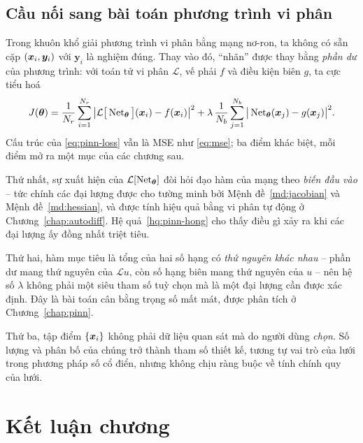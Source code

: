 \subsection{Cầu nối sang bài toán phương trình vi phân}
 
\begin{nhanxet}
\label{nx:cau-noi}
Trong khuôn khổ giải phương trình vi phân bằng mạng nơ-ron, ta không có sẵn cặp
$(\bm{x}_i,\bm{y}_i)$ với $\bm{y}_i$ là nghiệm đúng. Thay vào đó, ``nhãn'' được
thay bằng \emph{phần dư} của phương trình: với toán tử vi phân $\mathcal{L}$, vế
phải $f$ và điều kiện biên $g$, ta cực tiểu hoá
\begin{equation}
J(\bm{\theta})
 = \frac{1}{N_r}\sum_{i=1}^{N_r}
   \big| \mathcal{L}\big[\operatorname{Net}_{\bm{\theta}}\big](\bm{x}_i) - f(\bm{x}_i) \big|^{2}
 + \lambda\,\frac{1}{N_b}\sum_{j=1}^{N_b}
   \big| \operatorname{Net}_{\bm{\theta}}(\bm{x}_j) - g(\bm{x}_j) \big|^{2}.
\label{eq:pinn-loss}
\end{equation}
Cấu trúc của \eqref{eq:pinn-loss} vẫn là MSE như \eqref{eq:mse}; ba điểm khác
biệt, mỗi điểm mở ra một mục của các chương sau.
 
Thứ nhất, sự xuất hiện của $\mathcal{L}[\operatorname{Net}_{\bm{\theta}}]$ đòi hỏi đạo hàm của
mạng theo \emph{biến đầu vào} -- tức chính các đại lượng được cho tường minh bởi
Mệnh đề~\ref{md:jacobian} và Mệnh đề~\ref{md:hessian}, và được tính hiệu quả
bằng vi phân tự động ở Chương~\ref{chap:autodiff}.
Hệ quả~\ref{hq:pinn-hong} cho thấy điều gì xảy ra khi các đại lượng ấy đồng nhất
triệt tiêu.
 
Thứ hai, hàm mục tiêu là tổng của hai số hạng có \emph{thứ nguyên khác nhau} --
phần dư mang thứ nguyên của $\mathcal{L}u$, còn số hạng biên mang thứ nguyên của
$u$ -- nên hệ số $\lambda$ không phải một siêu tham số tuỳ chọn mà là một đại
lượng cần được xác định. Đây là bài toán cân bằng trọng số mất mát, được phân
tích ở Chương~\ref{chap:pinn}.
 
Thứ ba, tập điểm $\{\bm{x}_i\}$ không phải dữ liệu quan sát mà do người dùng
\emph{chọn}. Số lượng và phân bố của chúng trở thành tham số thiết kế, tương tự
vai trò của lưới trong phương pháp số cổ điển, nhưng không chịu ràng buộc về
tính chính quy của lưới.
\end{nhanxet}
 
\section*{Kết luận chương}
 
